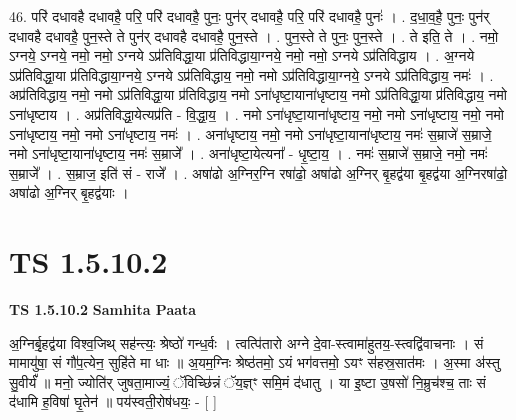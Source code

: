 \documentclass[17pt]{extarticle}
\begin{document}
46. परि॑ दधावहै दधावहै॒ परि॒ परि॑ दधावहै॒ पुनः॒ पुन॑र् दधावहै॒ परि॒ परि॑ दधावहै॒ पुनः॑ । . द॒धा॒व॒है॒ पुनः॒ पुन॑र् दधावहै दधावहै॒ पुन॒स्ते ते पुन॑र् दधावहै दधावहै॒ पुन॒स्ते । . पुन॒स्ते ते पुनः॒ पुन॒स्ते । . ते इति॒ ते । . नमो॒ ऽग्नये॒ ऽग्नये॒ नमो॒ नमो॒ ऽग्नये ऽप्र॑तिविद्धा॒या प्र॑तिविद्धाया॒ग्नये॒ नमो॒ नमो॒ ऽग्नये ऽप्र॑तिविद्धाय । . अ॒ग्नये ऽप्र॑तिविद्धा॒या प्र॑तिविद्धाया॒ग्नये॒ ऽग्नये ऽप्र॑तिविद्धाय॒ नमो॒ नमो ऽप्र॑तिविद्धाया॒ग्नये॒ ऽग्नये ऽप्र॑तिविद्धाय॒ नमः॑ । . अप्र॑तिविद्धाय॒ नमो॒ नमो ऽप्र॑तिविद्धा॒या प्र॑तिविद्धाय॒ नमो ऽना॑धृष्टा॒याना॑धृष्टाय॒ नमो ऽप्र॑तिविद्धा॒या प्र॑तिविद्धाय॒ नमो ऽना॑धृष्टाय । . अप्र॑तिविद्धा॒येत्यप्र॑ति - वि॒द्धा॒य॒ । . नमो ऽना॑धृष्टा॒याना॑धृष्टाय॒ नमो॒ नमो ऽना॑धृष्टाय॒ नमो॒ नमो ऽना॑धृष्टाय॒ नमो॒ नमो ऽना॑धृष्टाय॒ नमः॑ । . अना॑धृष्टाय॒ नमो॒ नमो ऽना॑धृष्टा॒याना॑धृष्टाय॒ नमः॑ स॒म्राजे॑ स॒म्राजे॒ नमो ऽना॑धृष्टा॒याना॑धृष्टाय॒ नमः॑ स॒म्राजे᳚ । . अना॑धृष्टा॒येत्यना᳚ - धृ॒ष्टा॒य॒ । . नमः॑ स॒म्राजे॑ स॒म्राजे॒ नमो॒ नमः॑ स॒म्राजे᳚ । . स॒म्राज॒ इति॑ सं - राजे᳚ । . अषा॑ढो अ॒ग्निर॒ग्नि रषा॑ढो॒ अषा॑ढो अ॒ग्निर् बृ॒हद्व॑या बृ॒हद्व॑या अ॒ग्निरषा॑ढो॒ अषा॑ढो अ॒ग्निर् बृ॒हद्व॑याः । \newline
\pagebreak
{}

\section{ TS 1.5.10.2 }

\textbf{TS 1.5.10.2 } \newline
\textbf{Samhita Paata} \newline

अ॒ग्निर्बृ॒हद्व॑या विश्व॒जिथ् सह॑न्त्यः॒ श्रेष्ठो॑ गन्ध॒र्वः । त्वत्पि॑तारो अग्ने दे॒वा-स्त्वामा॑हुतय॒-स्त्वद्वि॑वाचनाः । सं मामायु॑षा॒ सं गौ॑प॒त्येन॒ सुहि॑ते मा धाः ॥ अ॒यम॒ग्निः श्रेष्ठ॑तमो॒ ऽयं भग॑वत्तमो॒ ऽयꣳ स॑हस्र॒सात॑मः । अ॒स्मा अ॑स्तु सु॒वीर्यं᳚ ॥ मनो॒ ज्योति॑र् जुषता॒माज्यं॒ ॅविच्छि॑न्नं ॅय॒ज्ञ्ꣳ समि॒मं द॑धातु । या इ॒ष्टा उ॒षसो॑ नि॒म्रुच॑श्च॒ ताः सं द॑धामि ह॒विषा॑ घृ॒तेन॑ ॥ पय॑स्वती॒रोष॑धयः॒ - [ ] \newline
\end{document}

